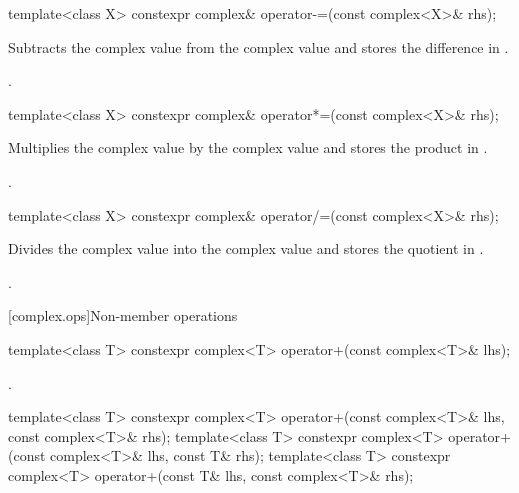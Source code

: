 %
\begin{itemdecl}
template<class X> constexpr complex& operator-=(const complex<X>& rhs);
\end{itemdecl}

\begin{itemdescr}
\pnum
\effects
Subtracts the complex value  from the complex value
and stores the difference in
.

\pnum
\returns
{}.
\end{itemdescr}

%
\begin{itemdecl}
template<class X> constexpr complex& operator*=(const complex<X>& rhs);
\end{itemdecl}

\begin{itemdescr}
\pnum
\effects
Multiplies the complex value  by the complex value
and stores the product in
.

\pnum
\returns
{}.
\end{itemdescr}

%
\begin{itemdecl}
template<class X> constexpr complex& operator/=(const complex<X>& rhs);
\end{itemdecl}

\begin{itemdescr}
\pnum
\effects
Divides the complex value  into the complex value
and stores the quotient in
.

\pnum
\returns
{}.
\end{itemdescr}

[complex.ops]{Non-member operations}

%
\begin{itemdecl}
template<class T> constexpr complex<T> operator+(const complex<T>& lhs);
\end{itemdecl}

\begin{itemdescr}
\pnum
\returns
{}.

\end{itemdescr}

\begin{itemdecl}
template<class T> constexpr complex<T> operator+(const complex<T>& lhs, const complex<T>& rhs);
template<class T> constexpr complex<T> operator+(const complex<T>& lhs, const T& rhs);
template<class T> constexpr complex<T> operator+(const T& lhs, const complex<T>& rhs);
\end{itemdecl}

